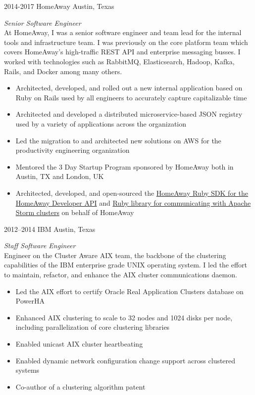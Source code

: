 \documentclass{friggeri-cv} %
\begin{document}
\begin{entrylist}
\entry
{2014-2017}
{HomeAway}
{Austin, Texas}
{\emph{Senior Software Engineer} \\
At HomeAway, I was a senior software engineer and team lead for the internal tools and infrastructure team. I was previously on the core platform team which covers HomeAway's high-traffic REST API and enterprise messaging busses. I worked with technologies such as RabbitMQ, Elasticsearch, Hadoop, Kafka, Rails, and Docker among many others. \\
\begin{itemize}
\item Architected, developed, and rolled out a new internal application based on Ruby on Rails used by all engineers to accurately capture capitalizable time
\item Architected and developed a distributed microservice-based JSON registry used by a variety of applications across the organization
\item Led the migration to and architected new solutions on AWS for the productivity engineering organization
\item Mentored the 3 Day Startup Program sponsored by HomeAway both in Austin, TX and London, UK
\item Architected, developed, and open-sourced the \href{https://github.com/homeaway/homeaway_api_ruby}{HomeAway Ruby SDK for the HomeAway Developer API} and \href{https://github.com/homeaway/homeaway-storm}{Ruby library for communicating with Apache Storm clusters} on behalf of HomeAway
\end{itemize}}
\end{entrylist}
\begin{entrylist}
\entry
{2012--2014}
{IBM}
{Austin, Texas}
{\emph{Staff Software Engineer} \\
Engineer on the Cluster Aware AIX team, the backbone of the clustering capabilities of the IBM enterprise grade UNIX operating system. I led the effort to maintain, refactor, and enhance the AIX cluster communications daemon. \\
\begin{itemize}
\item Led the AIX effort to certify Oracle Real Application Clusters database on PowerHA
\item Enhanced AIX clustering to scale to 32 nodes and 1024 disks per node, including parallelization of core clustering libraries
\item Enabled unicast AIX cluster heartbeating
\item Enabled dynamic network configuration change support across clustered systems
\item Co-author of a clustering algorithm patent 
\end{itemize}}
\end{entrylist}
\end{document}
